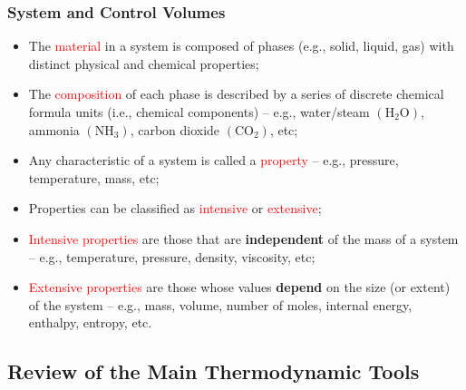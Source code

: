 \documentclass[10pt,compress,handout,ignorenonframetext]{beamer}
\begin{document}
\normalsize


\begin{frame}
 \frametitle{System and Control Volumes}
 \begin{itemize}
  \item <2-> The \textcolor{red}{material} in a system is composed of phases (e.g., solid, liquid, gas) with distinct physical and chemical properties;
  \item <3-> The \textcolor{red}{composition} of each phase is described by a series of discrete chemical formula units (i.e., chemical components) -- e.g., water/steam $\left(\right.$H$_{2}$O$\left.\right)$, ammonia $\left(\right.$NH$_{3}\left.\right)$, carbon dioxide $\left(\right.$CO$_{2}\left.\right)$, etc;
  \item <4-> Any characteristic of a system is called a \textcolor{red}{property} -- e.g., pressure, temperature, mass, etc;
  \item <5-> Properties can be classified as \textcolor{red}{intensive} or \textcolor{red}{extensive};
  \item <6-> \textcolor{red}{Intensive properties} are those that are {\bf independent} of the mass of a system -- e.g., temperature, pressure, density, viscosity, etc;
  \item <7-> \textcolor{red}{Extensive properties} are those whose values {\bf depend} on the size (or extent) of the system -- e.g., mass, volume, number of moles, internal energy, enthalpy, entropy, etc.  
 \end{itemize}
\end{frame}



\subsection{Review of the Main Thermodynamic Tools}
\end{document}
